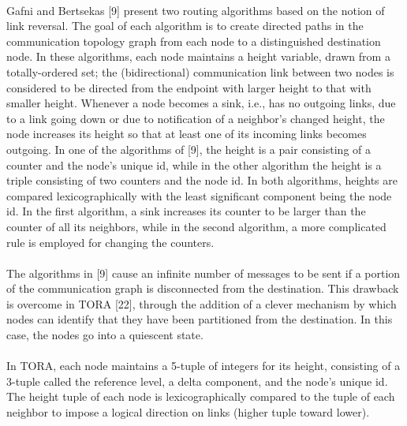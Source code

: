 \paragraph{}Gafni and Bertsekas [9] present two routing algorithms based on the notion of link reversal. The goal of each algorithm is to create directed paths in the communication topology graph from each node to a distinguished destination node. In these algorithms, each node maintains a height variable, drawn from a totally-ordered set; the (bidirectional) communication link between two nodes is considered to be directed from the endpoint with larger height to that with smaller height. Whenever a node becomes a sink, i.e., has no outgoing links, due to a link going down or due to notification of a neighbor’s changed height, the node increases its height so that at least one of its incoming links becomes outgoing. In one of the algorithms of [9], the height is a pair consisting of a counter and the node’s unique id, while in the other algorithm the height is a triple consisting of two counters and the node id. In both algorithms, heights are compared lexicographically with the least significant component being the node id. In the first algorithm, a sink increases its counter to be larger than the counter of all its neighbors, while in the second algorithm, a more complicated rule is employed for changing the counters.
\paragraph{}The algorithms in [9] cause an infinite number of messages to be sent if a portion of the communication graph is disconnected from the destination. This drawback is overcome in TORA [22], through the addition of a clever mechanism by which nodes can identify that they have been partitioned from the destination. In this case, the nodes go into a quiescent state.
\paragraph{}In TORA, each node maintains a 5-tuple of integers for its height, consisting of a 3-tuple called the reference level, a delta component, and the node’s unique id. The height tuple of each node is lexicographically compared to the tuple of each neighbor to impose a logical direction on links (higher tuple toward lower).
